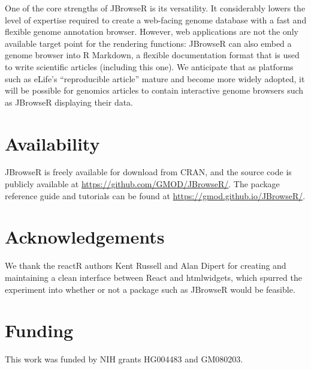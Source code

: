 \documentclass{bioinfo}
\begin{document}
One of the core strengths of JBrowseR is its versatility. It
considerably lowers the level of expertise required to create a
web-facing genome database with a fast and flexible genome annotation
browser. However, web applications are not the only available target
point for the rendering functions: JBrowseR can also embed a genome
browser into R Markdown, a flexible documentation format that is used to
write scientific articles (including this one). We anticipate that as
platforms such as eLife's ``reproducible article''
\citep{maciocci2019introducing} mature and become more widely adopted,
it will be possible for genomics articles to contain interactive genome
browsers such as JBrowseR displaying their data.

\section{Availability}

JBrowseR is freely available for download from CRAN, and the source code
is publicly available at
\href{https://github.com/GMOD/JBrowseR/}{https://github.com/GMOD/JBrowseR/}.
The package reference guide and tutorials can be found at
\href{https://gmod.github.io/JBrowseR/}{https://gmod.github.io/JBrowseR/}.

\section*{Acknowledgements}

We thank the reactR authors Kent Russell and Alan Dipert for creating
and maintaining a clean interface between React and htmlwidgets, which
spurred the experiment into whether or not a package such as JBrowseR
would be feasible.

\section*{Funding}

This work was funded by NIH grants HG004483 and GM080203.




\end{document}
